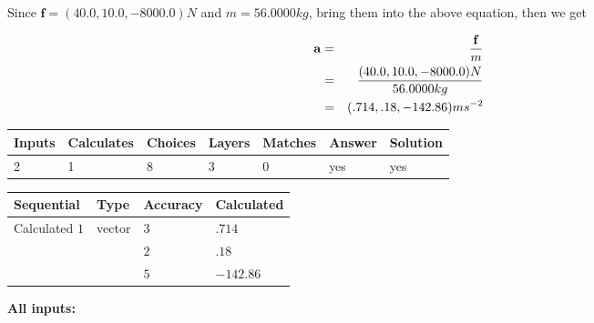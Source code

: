 \documentclass[12pt]{article}
\begin{document}
Since $\mathbf{f}= %
(40.0 , 10.0 , -8000.0) N$
and $m= %
56.0000kg$, bring them into the above equation, then we get
 
\begin{eqnarray*}
\mathbf{a}&=&\frac{\mathbf{f}}m  \\
&=&\frac{ %
(40.0 , 10.0 , -8000.0) N}{ %
56.0000kg}  \\
&=& %
(.714 , .18 , -142.86) ms^{-2}
\end{eqnarray*}
 
 
 
\noindent{}
 
 

 
\vspace{0.3in}
   
   
   
   
\noindent\begin{tabular}{|l|l|l|l|l|l|l|}
 \hline
Inputs & Calculates & Choices & Layers & Matches & Answer & Solution \\ \hline
           2 & 
           1 & 
           8
  & 
           3 & 
           0 & 
  yes & 
  yes 
  \\ \hline
 \end{tabular}
   
   
   
   
\noindent{}
   
   
  
  
\noindent\begin{tabular}{|l|l|l|l|}
\hline
 Sequential & Type & Accuracy & Calculated \\ 
\hline
 
 
  Calculated $           1$ & vector &  
  $           3 $ 
 &  $ .714 $ 
 \\    
  & & 
  $           2 $ 
 &  $ .18 $ 
 \\    
  & & 
  $           5 $ 
 &  $ -142.86 $ 
 \\  \hline  
 \end{tabular}
   
   
   
   
\noindent\vspace{0.1in}\hspace{-0.08in} {\textbf{\Large{All inputs: }}}
   
   
  
\end{document}
